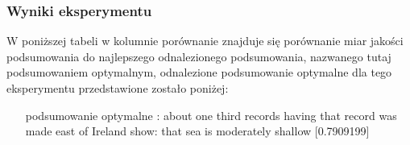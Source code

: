 \documentclass{article}
\begin{document}
\subsubsection{Wyniki eksperymentu}

W poniższej tabeli w kolumnie porównanie znajduje się porównanie miar jakości podsumowania do najlepszego odnalezionego podsumowania, nazwanego tutaj podsumowaniem optymalnym, odnalezione podsumowanie optymalne dla tego eksperymentu przedstawione zostało poniżej:

\begin{itemize}
    \item[podsumowanie optymalne]: about one third records having that record was made east of Ireland show: that sea is moderately shallow  [0.7909199]
\end{itemize}
\end{document}
